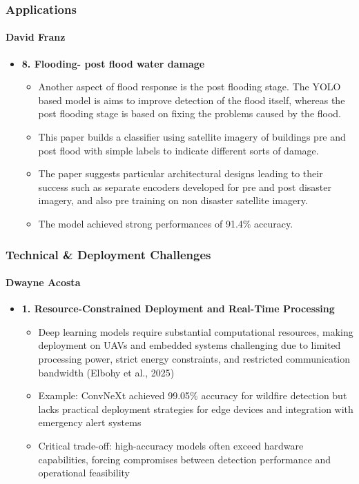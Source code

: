 \documentclass{beamer}
\newcommand{\namedframe}[3]{
  \begin{frame}
    \frametitle{#2}
    \framesubtitle{#1}
    #3
  \end{frame}
}
\begin{document}
\namedframe{David Franz}{Applications}{
\begin{itemize}
    \item \textbf{8. Flooding- post flood water damage}
    \begin{itemize}
        \item Another aspect of flood response is the post flooding stage. The YOLO based model is aims to improve detection of the flood itself, whereas the post flooding stage is based on fixing the problems caused by the flood.
        \item This paper builds a classifier using satellite imagery of buildings pre and post flood with simple labels to indicate different sorts of damage.  
        \item         The paper suggests particular architectural designs leading to their success such as separate encoders developed for pre and post disaster imagery, and also pre training on non disaster satellite imagery. 
        \item The model achieved strong performances of 91.4\% accuracy. 
    \end{itemize}
\end{itemize}
}



\namedframe{Dwayne Acosta}{Technical \& Deployment Challenges}{
\begin{itemize}
    \item \textbf{1. Resource-Constrained Deployment and Real-Time Processing}
    \begin{itemize}
        \item Deep learning models require substantial computational resources, making deployment on UAVs and embedded systems challenging due to limited processing power, strict energy constraints, and restricted communication bandwidth (Elbohy et al., 2025)
        \item Example: ConvNeXt achieved 99.05\% accuracy for wildfire detection but lacks practical deployment strategies for edge devices and integration with emergency alert systems
        \item Critical trade-off: high-accuracy models often exceed hardware capabilities, forcing compromises between detection performance and operational feasibility
    \end{itemize}
\end{itemize}
}
\end{document}
